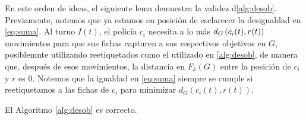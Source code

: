 \newpage

En este orden de ideas, el siguiente lema demuestra la validez
d\cref{alg:desob}. Previamente, notemos que ya estamos en posici\'on de
esclarecer la desigualdad en \ref{eq:suma}.  Al turno $I(t)$, el polic\'ia $c_i$
necesita a lo m\'as $d_G \left( c_i(t),r(t)\right)$ movimientos para que sus fichas
capturen a sus respectivos objetivos en $G$, posiblemnte utilizando
reetiquetados como el utilizado en \cref{alg:desob}, de manera que, despu\'es de
esos movimientos, la distancia en $F_k(G)$ entre la posici\'on de $c_i$ y $r$ es
$0$. Notemos que la igualdad en \ref{eq:suma} siempre se cumple si reetiquetamos
a las fichas de $c_i$ para minimizar $d_G (c_i(t), r(t))$.

\begin{lema}
\label{lem:obstruccion}
    El Algoritmo \ref{alg:desob} es correcto.
\end{lema}

